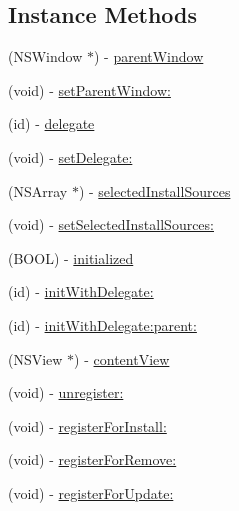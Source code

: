 \subsection*{Instance Methods}
\begin{DoxyCompactItemize}
\item 
(N\-S\-Window $\ast$) -\/ \hyperlink{interface_module_manage_view_controller_a9ccf139a397893d92fdbe729ea0f0f98}{parent\-Window}
\item 
(void) -\/ \hyperlink{interface_module_manage_view_controller_ac386c00f4ec3bdf188a499229bc04915}{set\-Parent\-Window\-:}
\item 
(id) -\/ \hyperlink{interface_module_manage_view_controller_a6c98e239b6ba279cfc95c64db9de555c}{delegate}
\item 
(void) -\/ \hyperlink{interface_module_manage_view_controller_a519500cb336926bf5ea101fed10648b9}{set\-Delegate\-:}
\item 
(N\-S\-Array $\ast$) -\/ \hyperlink{interface_module_manage_view_controller_a7d8d7790c7e30d061f74eb64da9cd4e6}{selected\-Install\-Sources}
\item 
(void) -\/ \hyperlink{interface_module_manage_view_controller_a064d8a2c7d38359571459ace7e08f2e9}{set\-Selected\-Install\-Sources\-:}
\item 
(B\-O\-O\-L) -\/ \hyperlink{interface_module_manage_view_controller_a91a8a6a18d6d5884a297af2305b50b30}{initialized}
\item 
(id) -\/ \hyperlink{interface_module_manage_view_controller_a31987d71b58e0520588676a4f6896d2c}{init\-With\-Delegate\-:}
\item 
(id) -\/ \hyperlink{interface_module_manage_view_controller_adc2e722dd0bf928095e5e6e37d392485}{init\-With\-Delegate\-:parent\-:}
\item 
(N\-S\-View $\ast$) -\/ \hyperlink{interface_module_manage_view_controller_a90ebec97204051c7d79f9856ac49e681}{content\-View}
\item 
(void) -\/ \hyperlink{interface_module_manage_view_controller_aa57825bf09aeddbf6500be8912b17ea9}{unregister\-:}
\item 
(void) -\/ \hyperlink{interface_module_manage_view_controller_a9bdadbaea66956d33473156acaf59aa4}{register\-For\-Install\-:}
\item 
(void) -\/ \hyperlink{interface_module_manage_view_controller_ac8b0ad6bd71aaa7ac28e5f197ba9a7cd}{register\-For\-Remove\-:}
\item 
(void) -\/ \hyperlink{interface_module_manage_view_controller_af0af4e16a7d4724fcd1968d56dc46ab4}{register\-For\-Update\-:}

\end{DoxyCompactItemize}

